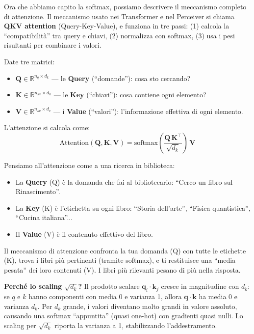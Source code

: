\documentclass[12pt,a4paper]{article}
\begin{document}
Ora che abbiamo capito la softmax, possiamo descrivere il meccanismo completo di attenzione. Il meccanismo usato nei Transformer e nel Perceiver si chiama \textbf{QKV attention} (Query-Key-Value), e funziona in tre passi: (1) calcola la ``compatibilit\`a'' tra query e chiavi, (2) normalizza con softmax, (3) usa i pesi risultanti per combinare i valori.

\begin{formulabox}
Date tre matrici:
\begin{itemize}
    \item $\mathbf{Q} \in \mathbb{R}^{n_q \times d_k}$ --- le \textbf{Query} (``domande''): cosa sto cercando?
    \item $\mathbf{K} \in \mathbb{R}^{n_{kv} \times d_k}$ --- le \textbf{Key} (``chiavi''): cosa contiene ogni elemento?
    \item $\mathbf{V} \in \mathbb{R}^{n_{kv} \times d_v}$ --- i \textbf{Value} (``valori''): l'informazione effettiva di ogni elemento.
\end{itemize}
L'attenzione si calcola come:
\[
    \text{Attention}(\mathbf{Q}, \mathbf{K}, \mathbf{V}) = \text{softmax}\!\left(\frac{\mathbf{Q}\,\mathbf{K}^\top}{\sqrt{d_k}}\right)\,\mathbf{V}
\]
\end{formulabox}

\begin{notabox}[title={In parole semplici: Q, K, V}]
Pensiamo all'attenzione come a una ricerca in biblioteca:
\begin{itemize}
    \item La \textbf{Query} (Q) \`e la domanda che fai al bibliotecario: ``Cerco un libro sul Rinascimento''.
    \item La \textbf{Key} (K) \`e l'etichetta su ogni libro: ``Storia dell'arte'', ``Fisica quantistica'', ``Cucina italiana''...
    \item Il \textbf{Value} (V) \`e il contenuto effettivo del libro.
\end{itemize}
Il meccanismo di attenzione confronta la tua domanda (Q) con tutte le etichette (K), trova i libri pi\`u pertinenti (tramite softmax), e ti restituisce una ``media pesata'' dei loro contenuti (V). I libri pi\`u rilevanti pesano di pi\`u nella risposta.
\end{notabox}

\textbf{Perch\'e lo scaling $\sqrt{d_k}$?} Il prodotto scalare $\mathbf{q}_i \cdot \mathbf{k}_j$ cresce in magnitudine con $d_k$: se $q$ e $k$ hanno componenti con media 0 e varianza 1, allora $\mathbf{q} \cdot \mathbf{k}$ ha media 0 e varianza $d_k$. Per $d_k$ grande, i valori diventano molto grandi in valore assoluto, causando una softmax ``appuntita'' (quasi one-hot) con gradienti quasi nulli. Lo scaling per $\sqrt{d_k}$ riporta la varianza a 1, stabilizzando l'addestramento.
\end{document}
